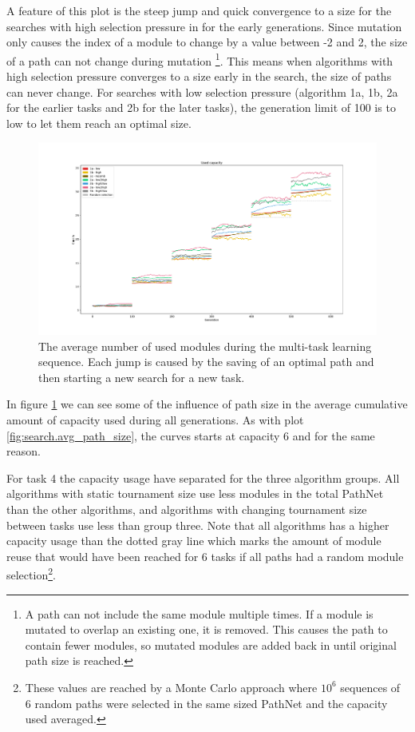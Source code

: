 A feature of this plot is the steep jump and quick convergence to a size for the searches with high selection pressure in for the early generations. Since mutation only causes the index of a module to change by a value between -2 and 2, the size of a path can not change during mutation \footnote{A path can not include the same module multiple times. If a module is mutated to overlap an existing one, it is removed. This causes the path to contain fewer modules, so mutated modules are added back in until original path size is reached.}. This means when algorithms with high selection pressure converges to a size early in the search, the size of paths can never change. For searches with low selection pressure (algorithm 1a, 1b, 2a for the earlier tasks and 2b for the later tasks), the generation limit of 100 is to low to let them reach an optimal size. 

\begin{figure}[p!]%
    \includegraphics[width=\textwidth]{Chapters/Experiments/search_algo/figures/Capacity_pr_generation.pdf}
    \caption{The average number of used modules during the multi-task learning sequence. Each jump is caused by the saving of an optimal path and then starting a new search for a new task. }
    \label{fig:search.capacity}
\end{figure}

In figure \ref{fig:search.capacity} we can see some of the influence of path size in the average cumulative amount of capacity used during all generations. As with plot \ref{fig:search.avg_path_size}, the curves starts at capacity 6 and for the same reason. 

For task 4 the capacity usage have separated for the three algorithm groups. All algorithms with static tournament size use less modules in the total PathNet than the other algorithms, and algorithms with changing tournament size between tasks use less than group three. Note that all algorithms has a higher capacity usage than the dotted gray line which marks the amount of module reuse that would have been reached for 6 tasks if all paths had a random module selection\footnote{These values are reached by a Monte Carlo approach where \(10^{6}\) sequences of 6 random paths were selected in the same sized PathNet and the capacity used averaged.}.


